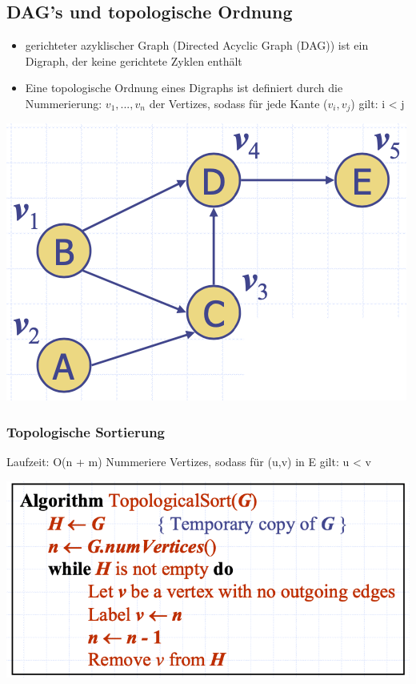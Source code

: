 \subsection{DAG’s und topologische Ordnung}
\begin{itemize}
    \item gerichteter azyklischer Graph (Directed Acyclic Graph (DAG)) ist ein Digraph, der keine gerichtete Zyklen enthält
    \item Eine topologische Ordnung eines Digraphs ist definiert durch die Nummerierung: $v_1 , ..., v_n$ der Vertizes, sodass für jede Kante ($v_i , v_j$) gilt: i < j
\end{itemize}
\vspace{-8pt}
\begin{center}
    \includegraphics[scale=.25]{graphic/14 Digraphs/DAG.png}
\end{center}
\vspace{-8pt}
\subsubsection{Topologische Sortierung}
Laufzeit: O(n + m)
Nummeriere Vertizes, sodass für (u,v) in E gilt: u < v
\vspace{-8pt}
\begin{center}
    \includegraphics[scale=.28]{graphic/14 Digraphs/topologische Sortierung.png}
\end{center}
\vspace{-8pt}
